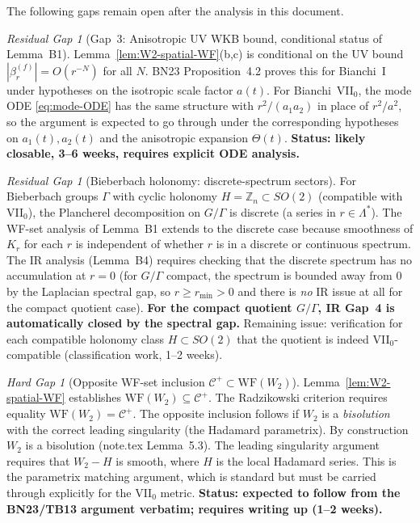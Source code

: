 \documentclass[12pt, a4paper]{article}
\theoremstyle{remark}
\newtheorem{hardgap}[theorem]{Hard Gap}
\newtheorem{residualgap}[theorem]{Residual Gap}
\newcommand{\bZ}{\mathbb{Z}}
\newcommand{\WF}{\mathrm{WF}}
\begin{document}
The following gaps remain open after the analysis in this document.

\begin{residualgap}[Gap~3: Anisotropic UV WKB bound, conditional status of Lemma~B1]\label{rgap:UV}
  Lemma~\ref{lem:W2-spatial-WF}(b,c) is conditional on the UV bound
  $|\beta_r^{(f)}| = O(r^{-N})$ for all $N$.  BN23 \cite{BN23}
  Proposition~4.2 proves this for Bianchi~I under hypotheses on the
  isotropic scale factor $a(t)$.  For Bianchi~VII$_0$, the mode ODE
  \eqref{eq:mode-ODE} has the same structure with $r^2/(a_1 a_2)$
  in place of $r^2/a^2$, so the argument is expected to go through
  under the corresponding hypotheses on $a_1(t), a_2(t)$ and the
  anisotropic expansion $\Theta(t)$.
  \textbf{Status: likely closable, 3--6 weeks, requires explicit ODE analysis.}
\end{residualgap}

\begin{residualgap}[Bieberbach holonomy: discrete-spectrum sectors]\label{rgap:holonomy}
  For Bieberbach groups $\Gamma$ with cyclic holonomy $H = \bZ_n
  \subset SO(2)$ (compatible with VII$_0$), the Plancherel decomposition
  on $G/\Gamma$ is discrete (a series in $r \in \Lambda^*$).
  The WF-set analysis of Lemma~B1 extends to the discrete case because
  smoothness of $K_r$ for each $r$ is independent of whether $r$ is
  in a discrete or continuous spectrum.
  The IR analysis (Lemma~B4) requires checking that the discrete spectrum
  has no accumulation at $r = 0$ (for $G/\Gamma$ compact, the spectrum
  is bounded away from $0$ by the Laplacian spectral gap, so $r \ge r_{\min} > 0$
  and there is \emph{no} IR issue at all for the compact quotient case).
  \textbf{For the compact quotient $G/\Gamma$, IR Gap~4 is automatically
  closed by the spectral gap.}
  Remaining issue: verification for each compatible holonomy class
  $H \subset SO(2)$ that the quotient is indeed VII$_0$-compatible
  (classification work, 1--2 weeks).
\end{residualgap}

\begin{hardgap}[Opposite WF-set inclusion $\mathcal{C}^+ \subset \WF(W_2)$]\label{rgap:opposite}
  Lemma~\ref{lem:W2-spatial-WF} establishes $\WF(W_2) \subseteq \mathcal{C}^+$.
  The Radzikowski criterion \cite{Rad96} requires equality
  $\WF(W_2) = \mathcal{C}^+$.
  The opposite inclusion follows if $W_2$ is a \emph{bisolution} with
  the correct leading singularity (the Hadamard parametrix).
  By construction $W_2$ is a bisolution (note.tex Lemma~5.3).
  The leading singularity argument requires that $W_2 - H$ is smooth,
  where $H$ is the local Hadamard series.  This is the parametrix
  matching argument, which is standard but must be carried through
  explicitly for the VII$_0$ metric.
  \textbf{Status: expected to follow from the BN23/TB13 argument
  verbatim; requires writing up (1--2 weeks).}
\end{hardgap}
\end{document}
